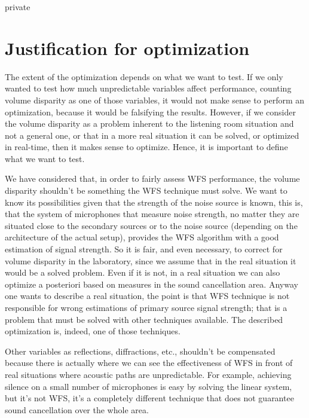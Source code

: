 \begin{shownto}{private}
\section{Justification for optimization}
The extent of the optimization depends on what we want to test. If we only wanted to test how much unpredictable variables affect performance, counting volume disparity as one of those variables, it would not make sense to perform an optimization, because it would be falsifying the results. However, if we consider the volume disparity as a problem inherent to the listening room situation and not a general one, or that in a more real situation it can be solved, or optimized in real-time, then it makes sense to optimize. Hence, it is important to define what we want to test.

We have considered that, in order to fairly assess WFS performance, the volume disparity shouldn't be something the WFS technique must solve. We want to know its possibilities given that the strength of the noise source is known, this is, that the system of microphones that measure noise strength, no matter they are situated close to the secondary sources or to the noise source (depending on the architecture of the actual setup), provides the WFS algorithm with a good estimation of signal strength. So it is fair, and even necessary, to correct for volume disparity in the laboratory, since we assume that in the real situation it would be a solved problem. Even if it is not, in a real situation we can also optimize a posteriori based on measures in the sound cancellation area. Anyway one wants to describe a real situation, the point is that WFS technique is not responsible for wrong estimations of primary source signal strength; that is a problem that must be solved with other techniques available. The described optimization is, indeed, one of those techniques.

Other variables as reflections, diffractions, etc., shouldn't be compensated because there is actually where we can see the effectiveness of WFS in front of real situations where acoustic paths are unpredictable. For example, achieving silence on a small number of microphones is easy by solving the linear system, but it's not WFS, it's a completely different technique that does not guarantee sound cancellation over the whole area.
\end{shownto}

